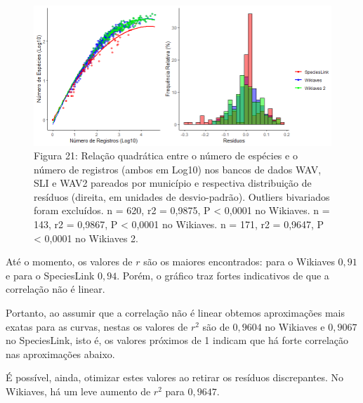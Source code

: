 \begin{figure}[h!]
\centering
\includegraphics[width = 15cm]{Imagens/G13.png}
\\{\scriptsize Figura 21: Relação quadrática entre o número de espécies e o número de registros (ambos em Log10) nos bancos de dados WAV, SLI e WAV2 pareados por município e respectiva distribuição de resíduos (direita, em unidades de desvio-padrão). Outliers bivariados foram excluídos. n = 620, r2 = 0,9875, P < 0,0001 no Wikiaves. n = 143, r2 = 0,9867, P < 0,0001 no Wikiaves. n = 171, r2 = 0,9647, P < 0,0001 no Wikiaves 2.}
\label{Figura 20}
\end{figure}

\begin{resposta}
Até o momento, os valores de $r$ são os maiores encontrados: para o Wikiaves $0,91$ e para o SpeciesLink $0,94$. Porém, o gráfico traz fortes indicativos de que a correlação não é linear.

Portanto, ao assumir que a correlação não é linear obtemos aproximações mais exatas para as curvas, nestas os valores de $r^2$ são de $0,9604$ no Wikiaves e $0,9067$ no SpeciesLink, isto é, os valores próximos de 1 indicam que há forte correlação nas aproximações abaixo.

É possível, ainda, otimizar estes valores ao retirar os resíduos discrepantes. No Wikiaves, há um leve aumento de $r^2$ para $0,9647$.


\end{resposta}